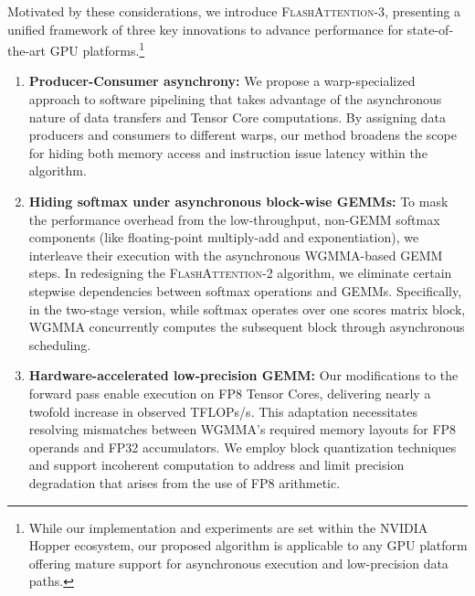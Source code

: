 Motivated by these considerations, we introduce \textsc{FlashAttention-3}, presenting a unified framework of three key innovations to advance performance for state-of-the-art GPU platforms.\footnote{While our implementation and experiments are set within the NVIDIA Hopper ecosystem, our proposed algorithm is applicable to any GPU platform offering mature support for asynchronous execution and low-precision data paths.}

\begin{enumerate}

\item \textbf{Producer-Consumer asynchrony:} We propose a warp-specialized approach to software pipelining that takes advantage of the asynchronous nature of data transfers and Tensor Core computations. By assigning data producers and consumers to different warps, our method broadens the scope for hiding both memory access and instruction issue latency within the algorithm.
\item \textbf{Hiding softmax under asynchronous block-wise GEMMs:} To mask the performance overhead from the low-throughput, non-GEMM softmax components (like floating-point multiply-add and exponentiation), we interleave their execution with the asynchronous WGMMA-based GEMM steps. In redesigning the \textsc{FlashAttention-2} algorithm, we eliminate certain stepwise dependencies between softmax operations and GEMMs. Specifically, in the two-stage version, while softmax operates over one scores matrix block, WGMMA concurrently computes the subsequent block through asynchronous scheduling.
\item \textbf{Hardware-accelerated low-precision GEMM:} Our modifications to the forward pass enable execution on FP8 Tensor Cores, delivering nearly a twofold increase in observed TFLOPs/s. This adaptation necessitates resolving mismatches between WGMMA's required memory layouts for FP8 operands and FP32 accumulators. We employ block quantization techniques and support incoherent computation to address and limit precision degradation that arises from the use of FP8 arithmetic.
\end{enumerate}

